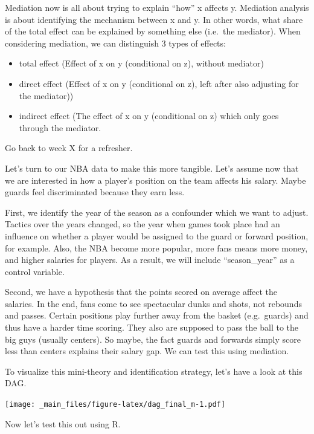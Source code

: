 \documentclass[
]{book}
\providecommand{\tightlist}{%
  \setlength{\itemsep}{0pt}\setlength{\parskip}{0pt}}
\begin{document}
Mediation now is all about trying to explain ``how'' x affects y. Mediation analysis
is about identifying the mechanism between x and y. In other words, what share
of the total effect can be explained by something else (i.e.~the mediator). When
considering mediation, we can distinguish 3 types of effects:

\begin{itemize}
\tightlist
\item
  total effect (Effect of x on y (conditional on z), without mediator)
\item
  direct effect (Effect of x on y (conditional on z), left after also adjusting for the mediator))
\item
  indirect effect (The effect of x on y (conditional on z) which only goes through the mediator.
\end{itemize}

Go back to week X for a refresher.

Let's turn to our NBA data to make this more tangible. Let's assume now that we are interested in how a player's position on the team affects his salary. Maybe guards feel
discriminated because they earn less.

First, we identify the year of the season as a confounder which we want to adjust.
Tactics over the years changed, so the year when games took place had an influence on
whether a player would be assigned to the guard or forward position, for example.
Also, the NBA become more popular, more fans means more money, and higher salaries
for players. As a result, we will include ``season\_year'' as a control variable.

Second, we have a hypothesis that the points scored on average affect the salaries.
In the end, fans come to see spectacular dunks and shots, not rebounds and passes.
Certain positions play further away from the basket (e.g.~guards) and thus have a harder time scoring. They also are supposed to pass the ball to the big guys (usually centers).
So maybe, the fact guards and forwards simply score less than centers explains their salary gap. We can test this using mediation.

To visualize this mini-theory and identification strategy, let's have a look at this DAG.

\texttt{[image: \_main\_files/figure-latex/dag\_final\_m-1.pdf]}

Now let's test this out using R.
\end{document}
